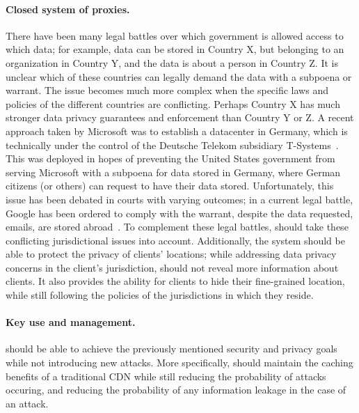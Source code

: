 \paragraph{Closed system of proxies.} There have been many legal battles over which government is allowed access 
to which data; for example, data can be stored in Country X, but belonging to an organization in Country Y, and 
the data is about a person in Country Z.  It is unclear which of these countries can legally demand 
the data with a subpoena or warrant.  The issue becomes much more complex when the specific laws 
and policies of the different countries are conflicting.  Perhaps Country X has much stronger data privacy 
guarantees and enforcement than Country Y or Z.  A recent approach taken by Microsoft was to establish 
a datacenter in Germany, which is technically under the control of the Deutsche Telekom subsidiary 
T-Systems~\cite{microsoft_germany}.  This was deployed in hopes of preventing the United States government from serving Microsoft with a subpoena 
for data stored in Germany, where German citizens (or others) can request to have their data stored.  Unfortunately, this issue has 
been debated in courts with varying outcomes; in a current legal battle, Google 
has been ordered to comply with the warrant, despite the data requested, emails, are stored abroad~\cite{google_warrant}.
  To complement these legal battles, \system{} should take 
these conflicting jurisdictional issues into account.  Additionally, the system should be able to protect 
the privacy of clients' locations; while addressing data privacy concerns in the client's jurisdiction, \system{} 
should not reveal more information about clients.  It also provides the ability for clients 
to hide their fine-grained location, while still following the policies of the jurisdictions in which 
they reside.

\paragraph{Key use and management.} \system{} should be able to achieve the previously mentioned security 
and privacy goals while not introducing new attacks.  More specifically, \system{} should maintain the 
caching benefits of a traditional CDN while still reducing 
the probability of attacks occuring, and reducing the probability of any information leakage in 
the case of an attack.


